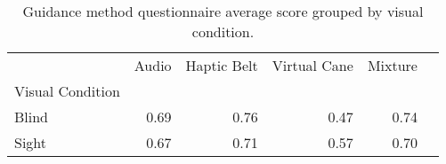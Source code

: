 
\begin{table}[!htb]
\centering
\caption{Guidance method questionnaire average score grouped by visual condition.}
\label{tab:questionnaire_average_group}
\begin{tabular}{lrrrrr}
\toprule
{} & Audio & Haptic Belt & Virtual Cane & Mixture \\
Visual Condition &       &             &              &         \\
\midrule
Blind            &  0.69 &        0.76 &         0.47 &    0.74 \\
Sight            &  0.67 &        0.71 &         0.57 &    0.70 \\
\bottomrule
\end{tabular}
\end{table}

